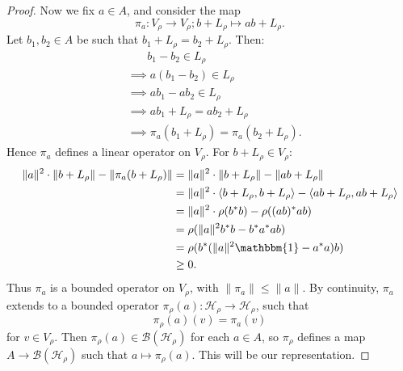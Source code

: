 \documentclass[12pt,a4paper]{report}
\theoremstyle{plain}
\theoremstyle{definition}
\newcommand{\1}{\mathbbm{1}}
\newcommand{\B}{\mathcal{B}}
\newcommand{\Hr}{\mathcal{H}_\rho}
\newcommand{\Vr}{V_\rho}
\begin{document}
\begin{proof}
	Now we fix $a \in A$, and consider the map 
	\[
		\pi_a : V_\rho \to V_\rho; b+L_\rho \mapsto ab+L_\rho.
	\]
	Let $b_1, b_2 \in A$ be such that $b_1+L_\rho = b_2+L_\rho$. Then:
	\begin{align*}
		&~~~~~~~~	b_1-b_2 \in L_\rho										\\	
		&\implies	a(b_1-b_2) \in L_\rho									\\	
		&\implies	ab_1-ab_2 \in L_\rho									\\	
		&\implies	ab_1 + L_\rho = ab_2+L_\rho								\\	
		&\implies	\pi_a(b_1+L_\rho) = \pi_a(b_2+L_\rho).
	\end{align*}
	Hence $\pi_a$ defines a linear operator on $V_\rho$.
	For $b+L_\rho \in V_\rho$:
	\begin{align*}
				\|a\|^2 \cdot \|b+L_\rho\| - \| \pi_a(b+L_\rho) \|
		&=		\|a\|^2 \cdot \|b+L_\rho\| - \| ab+L_\rho \|				\\
		&=		\|a\|^2 \cdot \langle b+L_\rho,b+L_\rho \rangle - 
									\langle ab+L_\rho,ab+L_\rho \rangle		\\
		&=		\|a\|^2 \cdot \rho(b^\ast b) - \rho ((ab)^\ast ab)			\\
		&= 		\rho (\|a\|^2 b^\ast b-b^\ast a^\ast ab)					\\
		&=		\rho (b^\ast (\|a\|^{2} \mathbbm{1} - a ^\ast a)b)			\\
		&\geq 	0.
	\end{align*}
	Thus $\pi_a$ is a bounded operator on $\Vr$, with $\|\pi_a\| \leq \|a\|$. By continuity,
	$\pi_a$ extends to a bounded operator $\pi_\rho(a):\Hr \to \Hr$,
	such that \[ \pi_\rho(a)(v) = \pi_a(v) \] for $v\in \Vr$. 
	Then $\pi_\rho(a) \in \B(\Hr)$ for each $a \in A$, so $\pi_\rho$ defines a map 
	$A \to \B(\Hr)$ such that $ a \mapsto \pi_\rho(a)$. This will be our representation.
	

\end{proof}
\end{document}
